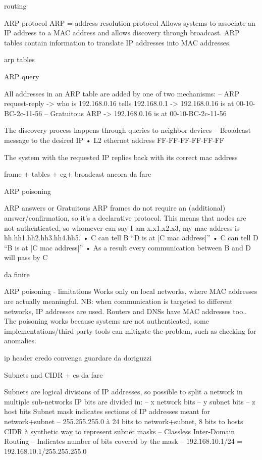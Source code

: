 routing 

ARP protocol
ARP = address resolution protocol
Allows systems to associate an IP address to a MAC address and allows discovery through broadcast. ARP tables contain information to translate IP addresses into MAC addresses.

arp tables 

ARP query

All addresses in an ARP table are added by one of two mechanisms:
– ARP request-reply
-> who is 192.168.0.16 tells 192.168.0.1
-> 192.168.0.16 is at 00-10-BC-2c-11-56
– Gratuitous ARP
-> 192.168.0.16 is at 00-10-BC-2c-11-56

The discovery process happens through queries to neighbor devices
– Broadcast message to the desired IP
• L2 ethernet address FF-FF-FF-FF-FF-FF

The system with the requested IP replies back with its correct mac address


frame + tables + eg+ broadcast ancora da fare 

ARP poisoning

ARP answers or Gratuitous ARP frames do not require an (additional) answer/confirmation, so it’s a declarative protocol. This means that nodes are not authenticated, so whomever can say I am x.x1.x2.x3, my mac address is hh.hh1.hh2.hh3.hh4.hh5.
• C can tell B “D is at [C mac address]”
• C can tell D “B is at [C mac address]”
• As a result every communication between B and D will pass by C

da finire

ARP poisoning - limitations
Works only on local networks, where MAC addresses are actually meaningful. 
NB: when communication is targeted to different networks, IP addresses are used.
Routers and DNSs have MAC addresses too..
The poisoning works because systems are not authenticated, some implementations/third party tools can mitigate the problem, such as checking for anomalies.

ip header credo convenga guardare da doriguzzi


Subnets and CIDR + es da fare 

Subnets are logical divisions of IP addresses, so possible to split a network in multiple sub-networks
IP bits are divided in:
– x network bits
– y subnet bits
– z host bits
Subnet mask indicates sections of IP addresses meant for network+subnet
– 255.255.255.0 à 24 bits to network+subnet, 8 bits to hosts
CIDR à synthetic way to represent subnet masks
– Classless Inter-Domain Routing
– Indicates number of bits covered by the mask
– 192.168.10.1/24 = 192.168.10.1/255.255.255.0
